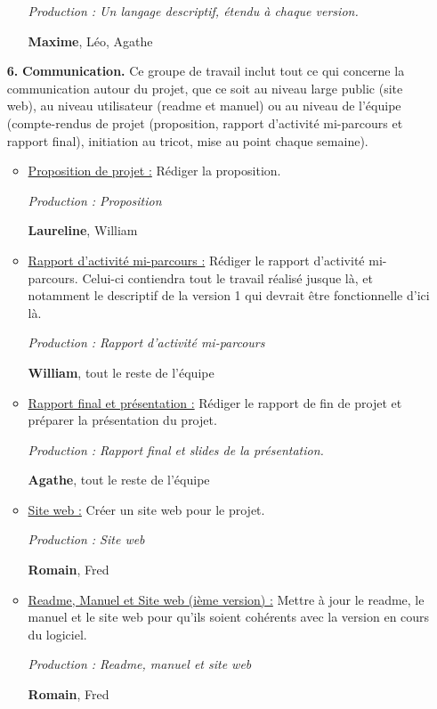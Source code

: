 \documentclass{article}
\begin{document}
\begin{itemize}
\begin{itemize}
    \textit{Production : Un langage descriptif, étendu à chaque version.}

    \textbf{Maxime}, Léo, Agathe

  \end{itemize}

\medskip

\item[\textbf{6.}] \textbf{Communication.} Ce groupe de travail inclut tout ce qui concerne la communication autour du projet, que ce soit au niveau
large public (site web), au niveau utilisateur (readme et manuel) ou au niveau de l'équipe (compte-rendus de projet (proposition, rapport
d'activité mi-parcours et rapport final), initiation au tricot, mise au point chaque semaine).


  \begin{itemize}
    \item \underline{Proposition de projet :} Rédiger la proposition.

    \textit{Production : Proposition}

    \textbf{Laureline}, William

    \item \underline{Rapport d'activité mi-parcours :} Rédiger le rapport d'activité mi-parcours. Celui-ci contiendra tout le travail réalisé jusque là,
et notamment le descriptif de la version 1 qui devrait être fonctionnelle d'ici là.

    \textit{Production : Rapport d'activité mi-parcours}

    \textbf{William}, tout le reste de l'équipe

    \item \underline{Rapport final et présentation :} Rédiger le rapport de fin de projet et préparer la présentation du projet.

    \textit{Production : Rapport final et slides de la présentation.}

    \textbf{Agathe}, tout le reste de l'équipe

    \item \underline{Site web :} Créer un site web pour le projet. %

    \textit{Production : Site web}

    \textbf{Romain}, Fred

    \item \underline{Readme, Manuel et Site web (ième version) :} Mettre à jour le readme, le manuel et le site web pour qu'ils soient cohérents avec la
version en cours du logiciel.

    \textit{Production : Readme, manuel et site web}

    \textbf{Romain}, Fred
  \end{itemize}

\medskip

\end{itemize}
\end{document}
